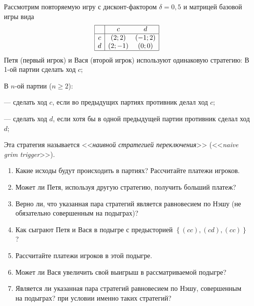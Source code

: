 \begin{problem}
\begin{sol}

\end{sol}
\end{problem}



\begin{problem}

Рассмотрим повторяемую игру с дисконт-фактором  $\delta =0,5$  и матрицей базовой игры вида
\[\begin{array}{|c|cc|}  \hline {} & {c} & {d} \\  \hline {c} & {(2;2)} & {(-1;2)} \\ {d} & {(2;-1)} & {(0;0)} \\  \hline  \end{array}\]
Петя (первый игрок) и Вася (второй игрок) используют одинаковую стратегию:
В 1-ой партии сделать ход  $c$;\par
В  $n$-ой партии ($n\ge 2$):\par
       --- сделать ход  $c$, если во  предыдущих партиях противник делал ход  $c$;\par
       --- сделать ход  $d$, если хотя бы в одной предыдущей партии противник сделал ход  $d$;\par
Эта стратегия называется <<{\it наивной стратегией переключения}>> (<<{\it naive grim trigger}>>).\par
\begin{enumerate}
\item Какие исходы будут происходить в партиях? Рассчитайте платежи игроков.\par
\item Может ли Петя, используя другую стратегию, получить больший платеж?\par
\item  Верно ли, что указанная пара стратегий является равновесием по Нэшу (не обязательно совершенным на подыграх)?\par
\item Как сыграют Петя и Вася в подыгре с предысторией  $\left\{\left(cc\right),\left(cd\right),\left(cc\right)\right\}$?\par
\item Рассчитайте платежи игроков в этой подыгре.\par
\item Может ли Вася увеличить свой выигрыш в рассматриваемой подыгре?\par
\item Является ли указанная пара стратегий равновесием по Нэшу, совершенным на подыграх? {\red при условии именно таких стратегий?}
\end{enumerate}


\begin{sol}

\end{sol}
\end{problem}



